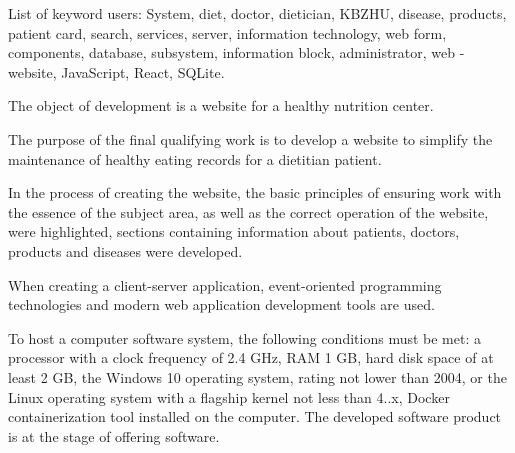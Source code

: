 List of keyword users: System, diet, doctor, dietician, KBZHU, disease, products, patient card, search, services, server, information technology, web form, components, database, subsystem, information block, administrator, web -website, JavaScript, React, SQLite.

The object of development is a website for a healthy nutrition center.

The purpose of the final qualifying work is to develop a website to simplify the maintenance of healthy eating records for a dietitian patient.

In the process of creating the website, the basic principles of ensuring work with the essence of the subject area, as well as the correct operation of the website, were highlighted, sections containing information about patients, doctors, products and diseases were developed.

When creating a client-server application, event-oriented programming technologies and modern web application development tools are used.

To host a computer software system, the following conditions must be met: a processor with a clock frequency of 2.4 GHz, RAM 1 GB, hard disk space of at least 2 GB, the Windows 10 operating system, rating not lower than 2004, or the Linux operating system with a flagship kernel not less than 4..x, Docker containerization tool installed on the computer.
The developed software product is at the stage of offering software.
